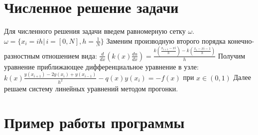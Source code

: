 \documentclass[a4paper,12pt,titlepage]{article}
\begin{document}
\section{Численное решение задачи}

Для численного решения задачи введем равномерную сетку $\omega$. \newline
$\omega = \{x_i = ih |\, i=[0,N], h = \frac{1}{N} \}$\newline
Заменим производную второго порядка конечно-разностным отношением вида: \newline
$\frac{d}{dx}(k(x)\frac{du}{dx}) = \frac{k(\frac{x_{i+1} - x{i}}{h}) - k(\frac{x_{i} - x{i-1}}{h})}{h}$\newline
Получим уравнение приближающее дифференциальное уравнение в узле:\newline
$k(x)\frac{y(x_{i+1})-2y(x_{i})+y(x_{i-1})}{h^2} - q(x)y(x_i)=-f(x)$ при $x \in (0, 1)$ \newline
Далее решаем систему линейных уравнений методом прогонки. \newline

\newpage
\section{Пример работы программы}
\end{document}
